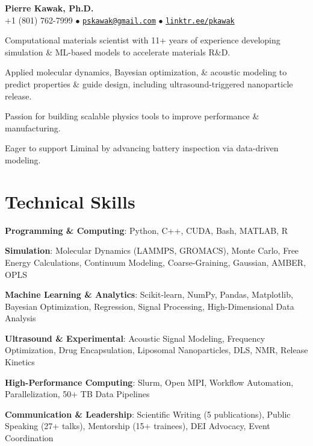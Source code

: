 \begin{center}
  {\LARGE \textbf{Pierre Kawak, Ph.D.} }\\[1ex]
  +1 (801) 762-7999 $\bullet$ \href{mailto:pskawak@gmail.com}{\tt pskawak@gmail.com} $\bullet$ \href{https://linktr.ee/pkawak}{\tt linktr.ee/pkawak}\\
\end{center}
\begin{tabitemize}
  \item Computational materials scientist with 11+ years of experience developing simulation \& ML-based models to accelerate materials R\&D.
  \item Applied molecular dynamics, Bayesian optimization, \& acoustic modeling to predict properties \& guide design, including ultrasound-triggered nanoparticle release.
  \item Passion for building scalable physics tools to improve performance \& manufacturing.
  \item Eager to support Liminal by advancing battery inspection via data-driven modeling.
\end{tabitemize}
\vspace{-1.5\baselineskip}
\section*{Technical Skills}
\begin{tabitemize}
  \item \textbf{Programming \& Computing}: Python, C++, CUDA, Bash, MATLAB, R
  \item \textbf{Simulation}: Molecular Dynamics (LAMMPS, GROMACS), Monte Carlo, Free Energy Calculations, Continuum Modeling, Coarse-Graining, Gaussian, AMBER, OPLS
  \item \textbf{Machine Learning \& Analytics}: Scikit-learn, NumPy, Pandas, Matplotlib, Bayesian Optimization, Regression, Signal Processing, High-Dimensional Data Analysis
  \item \textbf{Ultrasound \& Experimental}: Acoustic Signal Modeling, Frequency Optimization, Drug Encapsulation, Liposomal Nanoparticles, DLS, NMR, Release Kinetics
  \item \textbf{High-Performance Computing}: Slurm, Open MPI, Workflow Automation, Parallelization, 50+ TB Data Pipelines
  \item \textbf{Communication \& Leadership}: Scientific Writing (5 publications), Public Speaking (27+ talks), Mentorship (15+ trainees), DEI Advocacy, Event Coordination
\end{tabitemize}
\vspace{-1.6\baselineskip}
